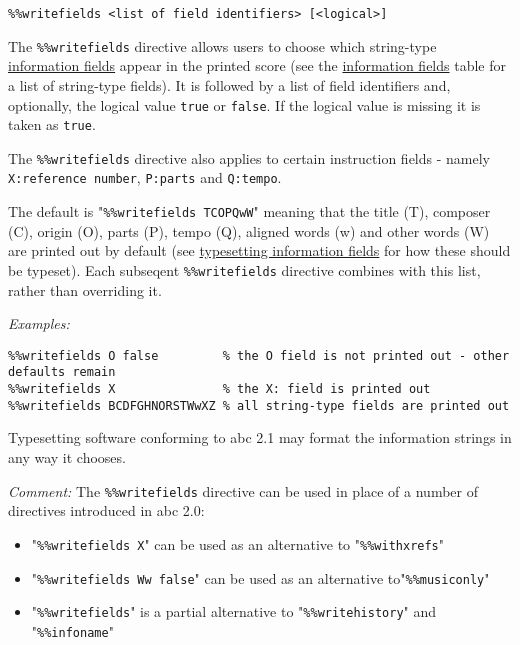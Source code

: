 \begin{verbatim}
%%writefields <list of field identifiers> [<logical>]
\end{verbatim}

The \texttt{\%\%writefields} directive allows users to choose which
string-type \protect\hyperlink{information_field_definition}{information
fields} appear in the printed score (see the
\protect\hyperlink{information_fields}{information fields} table for a
list of string-type fields). It is followed by a list of field
identifiers and, optionally, the logical value \texttt{true} or
\texttt{false}. If the logical value is missing it is taken as
\texttt{true}.

The \texttt{\%\%writefields} directive also applies to certain
instruction fields - namely \texttt{X:reference\ number},
\texttt{P:parts} and \texttt{Q:tempo}.

The default is "\texttt{\%\%writefields\ TCOPQwW}" meaning that the
title (T), composer (C), origin (O), parts (P), tempo (Q), aligned words
(w) and other words (W) are printed out by default (see
\protect\hyperlink{typesetting_information_fields}{typesetting
information fields} for how these should be typeset). Each subseqent
\texttt{\%\%writefields} directive combines with this list, rather than
overriding it.

\emph{Examples:}

\begin{verbatim}
%%writefields O false         % the O field is not printed out - other defaults remain
%%writefields X               % the X: field is printed out
%%writefields BCDFGHNORSTWwXZ % all string-type fields are printed out
\end{verbatim}

Typesetting software conforming to abc 2.1 may format the information
strings in any way it chooses.

\emph{Comment:} The \texttt{\%\%writefields} directive can be used in
place of a number of directives introduced in abc 2.0:

\begin{itemize}
\item
  "\texttt{\%\%writefields\ X}" can be used as an alternative to
  "\texttt{\%\%withxrefs}"
\item
  "\texttt{\%\%writefields\ Ww\ false}" can be used as an alternative
  to"\texttt{\%\%musiconly}"
\item
  "\texttt{\%\%writefields}" is a partial alternative to
  "\texttt{\%\%writehistory}" and "\texttt{\%\%infoname}"
\end{itemize}


